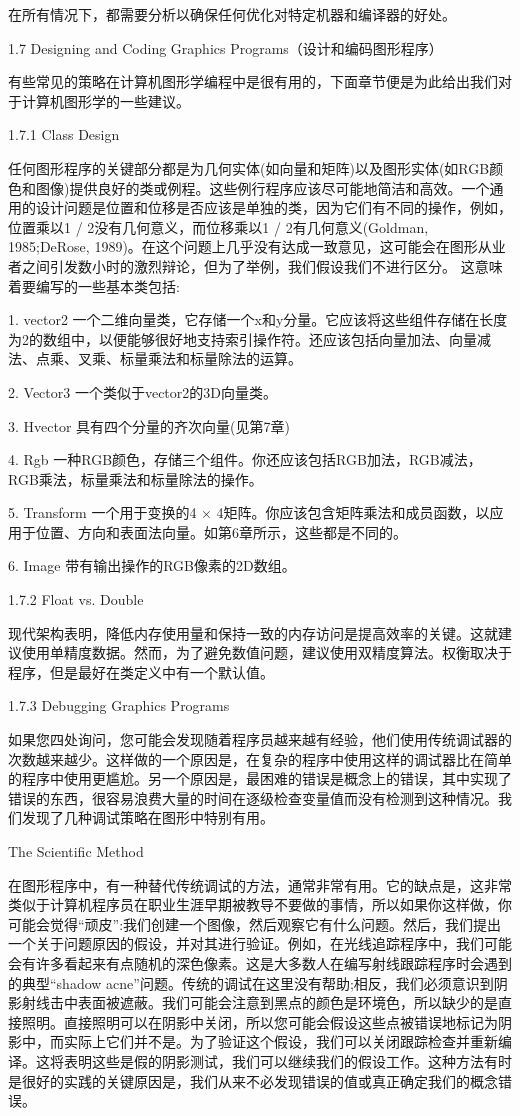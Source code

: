 在所有情况下，都需要分析以确保任何优化对特定机器和编译器的好处。

1.7 Designing and Coding Graphics Programs（设计和编码图形程序）

有些常见的策略在计算机图形学编程中是很有用的，下面章节便是为此给出我们对于计算机图形学的一些建议。

1.7.1 Class Design

任何图形程序的关键部分都是为几何实体(如向量和矩阵)以及图形实体(如RGB颜色和图像)提供良好的类或例程。这些例行程序应该尽可能地简洁和高效。一个通用的设计问题是位置和位移是否应该是单独的类，因为它们有不同的操作，例如，位置乘以1 / 2没有几何意义，而位移乘以1 / 2有几何意义(Goldman, 1985;DeRose, 1989)。在这个问题上几乎没有达成一致意见，这可能会在图形从业者之间引发数小时的激烈辩论，但为了举例，我们假设我们不进行区分。
这意味着要编写的一些基本类包括:

1.  vector2 一个二维向量类，它存储一个x和y分量。它应该将这些组件存储在长度为2的数组中，以便能够很好地支持索引操作符。还应该包括向量加法、向量减法、点乘、叉乘、标量乘法和标量除法的运算。

2.	Vector3 一个类似于vector2的3D向量类。

3.	Hvector 具有四个分量的齐次向量(见第7章)

4.	Rgb 一种RGB颜色，存储三个组件。你还应该包括RGB加法，RGB减法，RGB乘法，标量乘法和标量除法的操作。

5.	Transform 一个用于变换的4 × 4矩阵。你应该包含矩阵乘法和成员函数，以应用于位置、方向和表面法向量。如第6章所示，这些都是不同的。

6.	Image 带有输出操作的RGB像素的2D数组。

1.7.2 Float vs. Double

现代架构表明，降低内存使用量和保持一致的内存访问是提高效率的关键。这就建议使用单精度数据。然而，为了避免数值问题，建议使用双精度算法。权衡取决于程序，但是最好在类定义中有一个默认值。

1.7.3 Debugging Graphics Programs

如果您四处询问，您可能会发现随着程序员越来越有经验，他们使用传统调试器的次数越来越少。这样做的一个原因是，在复杂的程序中使用这样的调试器比在简单的程序中使用更尴尬。另一个原因是，最困难的错误是概念上的错误，其中实现了错误的东西，很容易浪费大量的时间在逐级检查变量值而没有检测到这种情况。我们发现了几种调试策略在图形中特别有用。

The Scientific Method

在图形程序中，有一种替代传统调试的方法，通常非常有用。它的缺点是，这非常类似于计算机程序员在职业生涯早期被教导不要做的事情，所以如果你这样做，你可能会觉得“顽皮”:我们创建一个图像，然后观察它有什么问题。然后，我们提出一个关于问题原因的假设，并对其进行验证。例如，在光线追踪程序中，我们可能会有许多看起来有点随机的深色像素。这是大多数人在编写射线跟踪程序时会遇到的典型“shadow acne”问题。传统的调试在这里没有帮助;相反，我们必须意识到阴影射线击中表面被遮蔽。我们可能会注意到黑点的颜色是环境色，所以缺少的是直接照明。直接照明可以在阴影中关闭，所以您可能会假设这些点被错误地标记为阴影中，而实际上它们并不是。为了验证这个假设，我们可以关闭跟踪检查并重新编译。这将表明这些是假的阴影测试，我们可以继续我们的假设工作。这种方法有时是很好的实践的关键原因是，我们从来不必发现错误的值或真正确定我们的概念错误。

